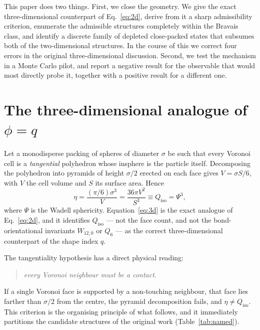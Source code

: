 \documentclass[aps,prl,twocolumn,superscriptaddress,floatfix]{revtex4-2}
\begin{document}
This paper does two things. First, we close the geometry. We give the exact
three-dimensional counterpart of Eq.~\eqref{eq:2d}, derive from it a sharp
admissibility criterion, enumerate the admissible structures completely within
the Bravais class, and identify a discrete family of depleted close-packed
states that subsumes both of the two-dimensional structures. In the course of
this we correct four errors in the original three-dimensional discussion.
Second, we test the mechanism in a Monte Carlo pilot, and report a negative
result for the observable that would most directly probe it, together with a
positive result for a different one.

\section{The three-dimensional analogue of $\phi=q$}
\label{sec:theorem}

Let a monodisperse packing of spheres of diameter $\sigma$ be such that every
Voronoi cell is a \emph{tangential} polyhedron whose insphere is the particle
itself. Decomposing the polyhedron into pyramids of height $\sigma/2$ erected on
each face gives $V=\sigma S/6$, with $V$ the cell volume and $S$ its surface
area. Hence
\begin{equation}
\eta = \frac{(\pi/6)\sigma^3}{V} = \frac{36\pi V^2}{S^3}
     \equiv Q_{\mathrm{iso}} = \Psi^3,
\label{eq:3d}
\end{equation}
where $\Psi$ is the Wadell sphericity. Equation~\eqref{eq:3d} is the exact
analogue of Eq.~\eqref{eq:2d}, and it identifies $Q_{\mathrm{iso}}$ --- not the
face count, and not the bond-orientational invariants $W_{12,0}$ or $Q_6$ --- as
the correct three-dimensional counterpart of the shape index $q$.

The tangentiality hypothesis has a direct physical reading:
\begin{quote}
\emph{every Voronoi neighbour must be a contact.}
\end{quote}
If a single Voronoi face is supported by a non-touching neighbour, that face lies
farther than $\sigma/2$ from the centre, the pyramid decomposition fails, and
$\eta \neq Q_{\mathrm{iso}}$. This criterion is the organising principle of what
follows, and it immediately partitions the candidate structures of the original
work (Table~\ref{tab:named}).
\end{document}
